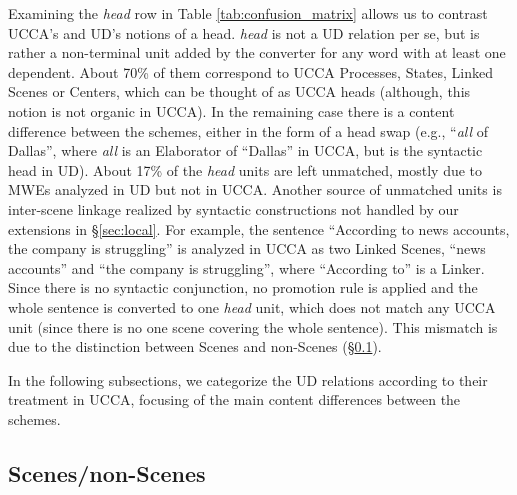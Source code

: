 \documentclass[11pt,a4paper]{article}
\begin{document}
Examining the {\it head} row in Table \ref{tab:confusion_matrix} allows
us to contrast UCCA's and UD's notions of a head. 
{\it head} is not a UD relation per se, but is rather a non-terminal unit
added by the converter for any word with at least one dependent.
About 70\% of them correspond to UCCA Processes, States, Linked Scenes or Centers,
which can be thought of as UCCA heads (although, this notion is not organic in UCCA).
In the remaining case there is a content difference between the schemes,
either in the form of a head swap (e.g., ``\textit{all} of Dallas'', where \textit{all} 
is an Elaborator of ``Dallas'' in UCCA, but is the syntactic head in UD).
About 17\% of the {\it head} units are left unmatched, mostly due to MWEs analyzed in
UD but not in UCCA.
Another source of unmatched units is inter-scene linkage realized by syntactic
constructions not handled by our extensions in \S\ref{sec:local}.
For example, the sentence
``According to news accounts, the company is struggling''
is analyzed in UCCA as two Linked Scenes,
``news accounts'' and ``the company is struggling'', where ``According to'' is a Linker.
Since there is no syntactic conjunction, no promotion rule is applied and the whole
sentence is converted to one \textit{head} unit, which does not match any UCCA unit
(since there is no one scene covering the whole sentence).
This mismatch is due to the distinction between Scenes and non-Scenes (\S\ref{sec:scenes}).

In the following subsections, we categorize the UD relations according to their
treatment in UCCA, focusing of the main content differences between the schemes.

\subsection{Scenes/non-Scenes}\label{sec:scenes}
\end{document}
